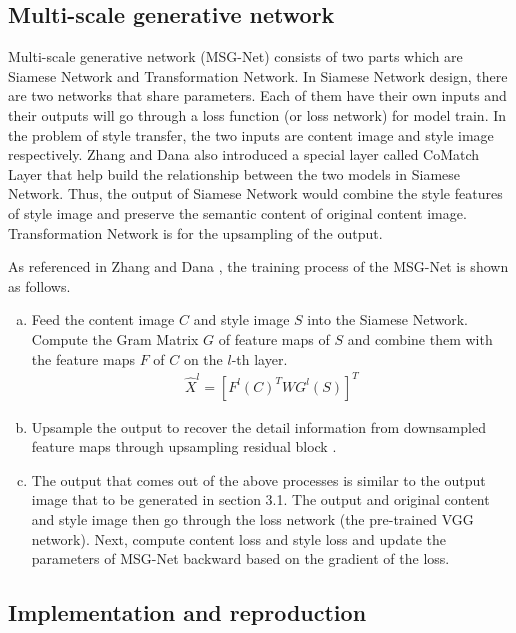 \documentclass[10pt,twocolumn,letterpaper]{article}
\begin{document}
\subsection{Multi-scale generative network \cite{Authors04}}
Multi-scale generative network (MSG-Net) consists of two parts which are 
Siamese Network and Transformation Network. In Siamese Network \cite{Authors07} design, there are two networks that share parameters. Each of them have their own inputs and their outputs will go through a loss function (or loss network) for model train. In the problem of style transfer, the two inputs are content image and style image respectively. Zhang and Dana \cite{Authors04} also introduced a special layer called CoMatch Layer that help build the relationship between the two models in Siamese Network. Thus, the output of Siamese Network would combine the style features of style image and preserve the semantic content of original content image. Transformation Network is for the upsampling of the output.


\noindent As referenced in Zhang and Dana \cite{Authors04}, the training process of the MSG-Net is shown as follows.
\begin{enumerate}[a.]
    \item Feed the content image $C$ and style image $S$ into the Siamese Network. Compute the Gram Matrix $G$ of feature maps of $S$ and combine them with the feature maps $F$ of $C$ on the $l$-th layer.
    \begin{align}
        \hat X^l = [F^l(C)^T W G^l(S)]^T
    \end{align}
    \item Upsample the output to recover the detail information from downsampled feature maps through upsampling residual block \cite{Authors08}.
    \item The output that comes out of the above processes is similar to the output image that to be generated in section 3.1. The output and original content and style image then go through the loss network (the pre-trained VGG network). Next, compute content loss and style loss and update the parameters of MSG-Net backward based on the gradient of the loss.
\end{enumerate}


\subsection{Implementation and reproduction}
\end{document}
